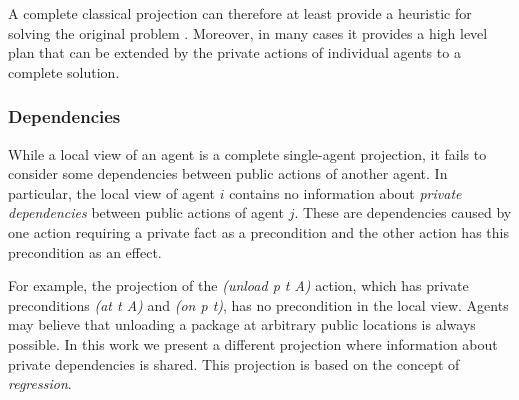 \documentclass[letterpaper]{article}
\newcommand\roni[1]{\textcolor{blue}{roni: #1}}
\theoremstyle{definition}
\begin{document}
A complete classical projection can therefore at least provide a heuristic for solving the original problem \cite{nissim2014distributed}. Moreover, in many cases it provides a high level plan that can be extended by the private actions of individual agents to a complete solution.





\subsubsection{Dependencies}

While a local view of an agent is a complete single-agent projection, it fails to consider some dependencies between public actions of another agent. In particular, 
the local view of agent $i$ contains no information about {\em private dependencies} between public actions of agent $j$. These are dependencies caused by one action requiring a private fact as a precondition and the other action has this precondition as an effect. 

For example, the projection of the {\em (unload p t A)} action, which has private preconditions {\em (at t A)} and {\em (on p t)}, has no precondition in the local view. Agents may believe that unloading a package at arbitrary public locations is always possible. In this work we present a different projection where information about private dependencies is shared. This projection is based on the concept of {\em regression}. %




\end{document}
